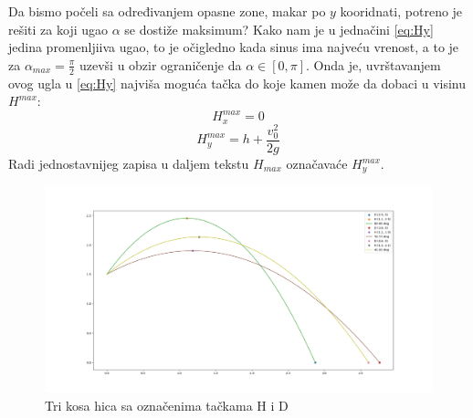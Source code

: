 \documentclass[a4paper]{article}
\begin{document}
Da bismo počeli sa određivanjem opasne zone, makar po $y$ kooridnati, 
potreno je rešiti za koji ugao $\alpha$ se dostiže maksimum? 
Kako nam je u jednačini \ref{eq:Hy} jedina promenljiiva ugao, 
to je očigledno kada sinus ima najveću vrenost,
a to je za $\alpha_{max} = \frac{\pi}{2}$ uzevši u obzir ograničenje 
da $\alpha \in [0, \pi]$. Onda je, uvrštavanjem ovog ugla u \ref{eq:Hy}
 najviša moguća tačka do koje kamen može da dobaci u visinu $H^{max}$:
\begin{equation}
\label{eq:Hmax_x}
H^{max}_{x} = 0
\end{equation}
\begin{equation}
\label{eq:Hmax_y}
H^{max}_{y} = h + \frac{v_0^2 }{2g}
\end{equation}
Radi jednostavnijeg zapisa u daljem tekstu $H_{max}$ označavaće $H^{max}_y$.

\begin{figure}[h!]
\begin{center}
\includegraphics[width=\textwidth]{2D_hitac_vise.png}
\end{center}
\caption{Tri kosa hica sa označenima tačkama H i D}
\label{fig:kosi_hitac_tacke}
\end{figure}
\end{document}
